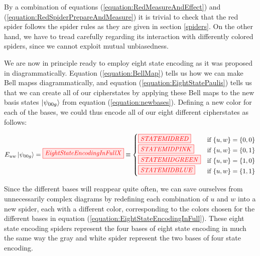 \documentclass[]{article}
\begin{document}
By a combination of equations (\ref{equation:RedMeasureAndEffect}) and (\ref{equation:RedSpiderPrepareAndMeasure}) it is trivial to check that the red spider follows the spider rules as they are given in section \ref{spiders}. On the other hand, we have to tread carefully regarding its interaction with differently colored spiders, since we cannot exploit mutual unbiasedness.

We are now in principle ready to employ eight state encoding as it was proposed in \cite{DeVries2016} diagrammatically. Equation (\ref{equation:BellMap}) tells us how we can make Bell mapss diagrammatically, and equation (\ref{equation:EightStatePaulis}) tells us that we can create all of our cipherstates by applying these Bell maps to the new basis states $\ket{\psi_{00g}}$ from equation (\ref{equation:newbases}). Defining a new color for each of the bases, we could thus encode all of our eight different cipherstates as follows:

\begin{equation}
	\label{equation:EightStateEncodingInFull}
	E_{uw}\ket{\psi_{00g}} = \tikzfig{EightStateEncodingInFullX} \equiv 
	\begin{cases}
	\tikzfig{STATEMIDRED} & \text{if} ~\{u,w\} = \{0,0\} \\
	\tikzfig{STATEMIDPINK} & \text{if} ~\{u,w\} = \{0,1\} \\
	\tikzfig{STATEMIDGREEN} & \text{if} ~\{u,w\} = \{1,0\} \\
	\tikzfig{STATEMIDBLUE} & \text{if} ~\{u,w\} = \{1,1\} \\
	\end{cases}
\end{equation}

Since the different bases will reappear quite often, we can save ourselves from unnecessarily complex diagrams by redefining each combination of $u$ and $w$ into a new spider, each with a different color, corresponding to the colors chosen for the different bases in equation (\ref{equation:EightStateEncodingInFull}). These eight state encoding spiders represent the four bases of eight state encoding in much the same way the gray and white spider represent the two bases of four state encoding.

\end{document}
